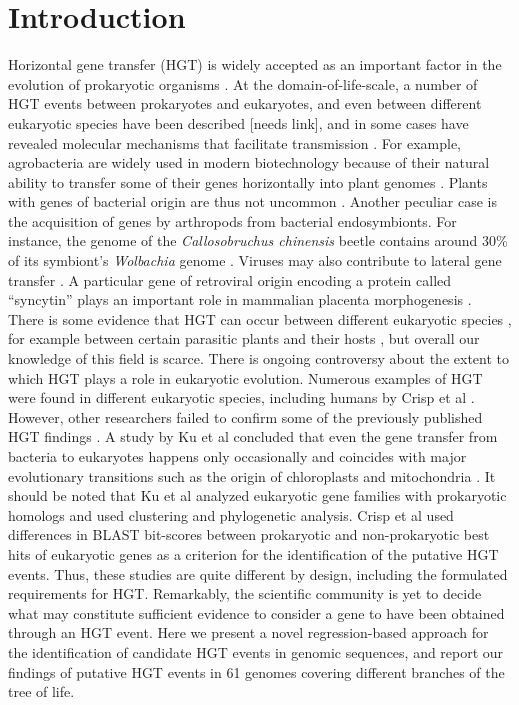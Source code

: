 \section{Introduction}
\label{intro}
Horizontal gene transfer (HGT) is widely accepted as an important factor in the
evolution of prokaryotic organisms \cite{Ochman2000}. At the
domain-of-life-scale, a number of HGT events between prokaryotes and
eukaryotes, and even between different eukaryotic species have been described
[needs link], and in some cases have revealed molecular mechanisms that
facilitate transmission \cite{Soucy2015}. For example, agrobacteria are widely
used in modern biotechnology because of their natural ability to transfer some
of their genes horizontally into plant genomes \cite{Chilton1977}. Plants with
genes of bacterial origin are thus not uncommon \cite{Kyndt2015, Matveeva2012,
Matveeva2014}. Another peculiar case is the acquisition of genes by arthropods
from bacterial endosymbionts. For instance, the genome of the
\textit{Callosobruchus chinensis} beetle contains around 30\% of its symbiont's
\textit{Wolbachia} genome \cite{Nikoh2008}. Viruses may also contribute to
lateral gene transfer \cite{Drezen2017}. A particular gene of retroviral origin
encoding a protein called ``syncytin'' plays an important role in mammalian
placenta morphogenesis \cite{Mi2000}. There is some evidence that HGT can occur
between different eukaryotic species \cite{Soucy2015}, for example between
certain parasitic plants and their hosts \cite{Yoshida2010, Xi2012, Zhang2013,
Zhang2014}, but overall our knowledge of this field is scarce. There is ongoing
controversy about the extent to which HGT plays a role in eukaryotic evolution.
Numerous examples of HGT were found in different eukaryotic species, including
humans by Crisp et al \cite{Crisp2015}. However, other researchers failed to
confirm some of the previously published HGT findings \cite{Salzberg2017}. A
study by Ku et al concluded that even the gene transfer from bacteria to
eukaryotes happens only occasionally and coincides with major evolutionary
transitions such as the origin of chloroplasts and mitochondria \cite{Ku2015}.
It should be noted that Ku et al analyzed eukaryotic gene families with
prokaryotic homologs and used clustering and phylogenetic analysis. Crisp et al
used differences in BLAST bit-scores between prokaryotic and non-prokaryotic
best hits of eukaryotic genes as a criterion for the identification of the
putative HGT events. Thus, these studies are quite different by design,
including the formulated requirements for HGT. Remarkably, the scientific
community is yet to decide what may constitute sufficient evidence to consider
a gene to have been obtained through an HGT event. Here we present a novel
regression-based approach for the identification of candidate HGT events in
genomic sequences, and report our findings of putative HGT events in 61 genomes
covering different branches of the tree of life.
